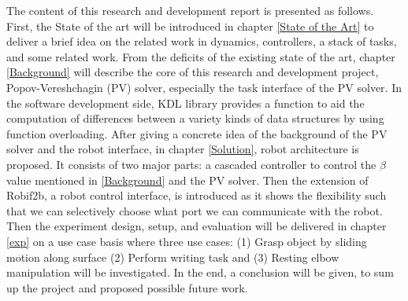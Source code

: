 \documentclass[report.tex]{subfiles}
\begin{document}
    The content of this research and development report is presented as follows. First, the State of the art will be introduced in chapter \ref{State of the Art} to deliver a brief idea on the related work in dynamics, controllers, a stack of tasks, and some related work. From the deficits of the existing state of the art, chapter \ref{Background} will describe the core of this research and development project, Popov-Vereshchagin (PV) solver, especially the task interface of the PV solver. In the software development side, KDL library provides a function to aid the computation of differences between a variety kinds of data structures by using function overloading. After giving a concrete idea of the background of the PV solver and the robot interface, in chapter \ref{Solution}, robot architecture is proposed. It consists of two major parts: a cascaded controller to control the $\beta$ value mentioned in \ref{Background} and the PV solver. Then the extension of Robif2b, a robot control interface, is introduced as it shows the flexibility such that we can selectively choose what port we can communicate with the robot. Then the experiment design, setup, and evaluation will be delivered in chapter \ref{exp} on a use case basis where three use cases: (1) Grasp object by sliding motion along surface (2) Perform writing task and (3) Resting elbow manipulation will be investigated. In the end, a conclusion will be given, to sum up the project and proposed possible future work.
    
\end{document}
